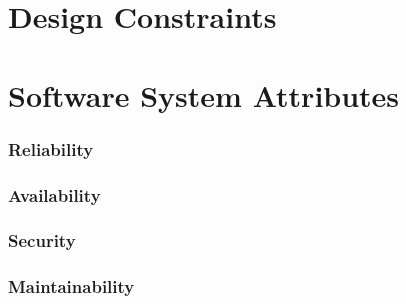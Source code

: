 \documentclass{article}
\begin{document}
\section{Design Constraints}

\section{Software System Attributes}
\subsubsection{Reliability}
\subsubsection{Availability}
\subsubsection{Security}
\subsubsection{Maintainability}
\end{document}
